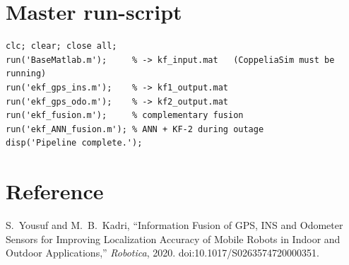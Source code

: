 \documentclass[11pt,a4paper]{article}
\begin{document}
\appendix
\section{Master run-script}\label{app:run}
\begin{lstlisting}[caption={\texttt{run\_all.m} --- runs the pipeline in the correct order.}]
clc; clear; close all;
run('BaseMatlab.m');     % -> kf_input.mat   (CoppeliaSim must be running)
run('ekf_gps_ins.m');    % -> kf1_output.mat
run('ekf_gps_odo.m');    % -> kf2_output.mat
run('ekf_fusion.m');     % complementary fusion
run('ekf_ANN_fusion.m'); % ANN + KF-2 during outage
disp('Pipeline complete.');
\end{lstlisting}

\section*{Reference}
S.~Yousuf and M.~B.~Kadri, ``Information Fusion of GPS, INS and Odometer Sensors for
Improving Localization Accuracy of Mobile Robots in Indoor and Outdoor
Applications,'' \textit{Robotica}, 2020. doi:10.1017/S0263574720000351.
\end{document}
